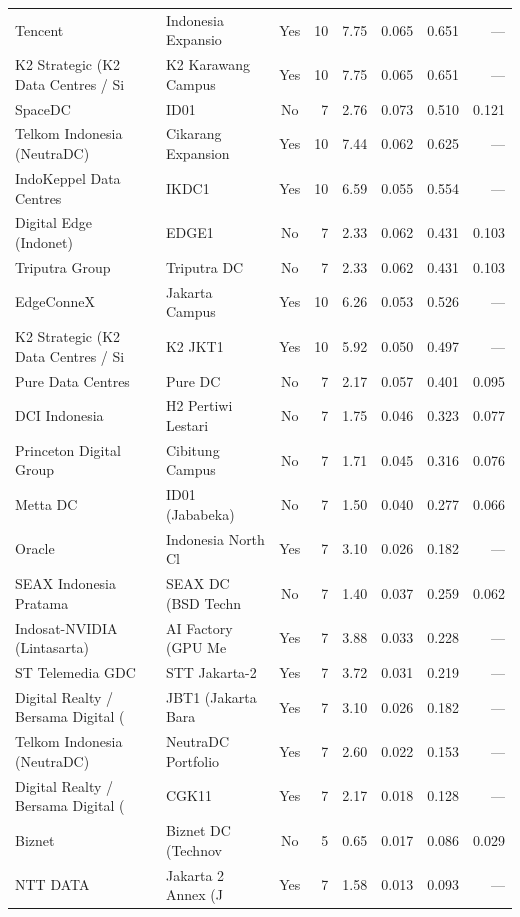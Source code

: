 \documentclass[11pt,english]{article}
\begin{document}
\begin{table}[H]
\begin{threeparttable}
\begin{tabular}{l l c r r r r r}
  Tencent & Indonesia Expansio & Yes & 10 & 7.75 & 0.065 & 0.651 & --- \\
  K2 Strategic (K2 Data Centres / Si & K2 Karawang Campus & Yes & 10 & 7.75 & 0.065 & 0.651 & --- \\
  SpaceDC & ID01 & No & 7 & 2.76 & 0.073 & 0.510 & 0.121 \\
  Telkom Indonesia (NeutraDC) & Cikarang Expansion & Yes & 10 & 7.44 & 0.062 & 0.625 & --- \\
  IndoKeppel Data Centres & IKDC1 & Yes & 10 & 6.59 & 0.055 & 0.554 & --- \\
  Digital Edge (Indonet) & EDGE1 & No & 7 & 2.33 & 0.062 & 0.431 & 0.103 \\
  Triputra Group & Triputra DC & No & 7 & 2.33 & 0.062 & 0.431 & 0.103 \\
  EdgeConneX & Jakarta Campus & Yes & 10 & 6.26 & 0.053 & 0.526 & --- \\
  K2 Strategic (K2 Data Centres / Si & K2 JKT1 & Yes & 10 & 5.92 & 0.050 & 0.497 & --- \\
  Pure Data Centres & Pure DC & No & 7 & 2.17 & 0.057 & 0.401 & 0.095 \\
  DCI Indonesia & H2 Pertiwi Lestari & No & 7 & 1.75 & 0.046 & 0.323 & 0.077 \\
  Princeton Digital Group & Cibitung Campus & No & 7 & 1.71 & 0.045 & 0.316 & 0.076 \\
  Metta DC & ID01 (Jababeka) & No & 7 & 1.50 & 0.040 & 0.277 & 0.066 \\
  Oracle & Indonesia North Cl & Yes & 7 & 3.10 & 0.026 & 0.182 & --- \\
  SEAX Indonesia Pratama & SEAX DC (BSD Techn & No & 7 & 1.40 & 0.037 & 0.259 & 0.062 \\
  Indosat-NVIDIA (Lintasarta) & AI Factory (GPU Me & Yes & 7 & 3.88 & 0.033 & 0.228 & --- \\
  ST Telemedia GDC & STT Jakarta-2 & Yes & 7 & 3.72 & 0.031 & 0.219 & --- \\
  Digital Realty / Bersama Digital ( & JBT1 (Jakarta Bara & Yes & 7 & 3.10 & 0.026 & 0.182 & --- \\
  Telkom Indonesia (NeutraDC) & NeutraDC Portfolio & Yes & 7 & 2.60 & 0.022 & 0.153 & --- \\
  Digital Realty / Bersama Digital ( & CGK11 & Yes & 7 & 2.17 & 0.018 & 0.128 & --- \\
  Biznet & Biznet DC (Technov & No & 5 & 0.65 & 0.017 & 0.086 & 0.029 \\
  NTT DATA & Jakarta 2 Annex (J & Yes & 7 & 1.58 & 0.013 & 0.093 & --- \\

\end{tabular}
\end{threeparttable}
\end{table}
\end{document}
